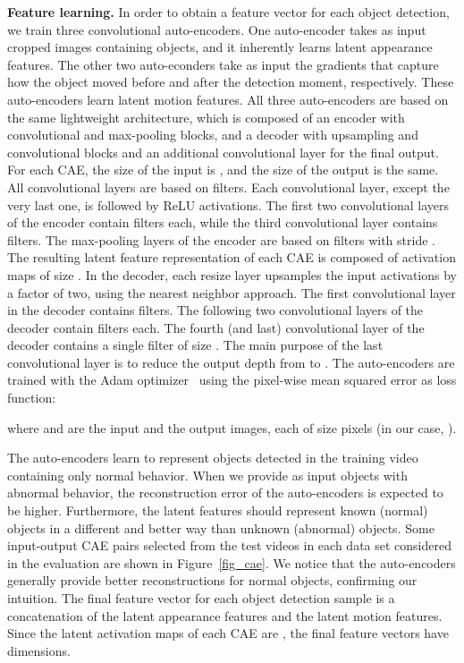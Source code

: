 \documentclass[10pt,twocolumn,letterpaper]{article}
\begin{document}
\noindent
{\bf Feature learning.}
In order to obtain a feature vector for each object detection, we train three convolutional auto-encoders. One auto-encoder takes as input cropped images containing objects, and it inherently learns latent appearance features. The other two auto-econders take as input the gradients that capture how the object moved before and after the detection moment, respectively. These auto-encoders learn latent motion features. All three auto-encoders are based on the same lightweight architecture, which is composed of an encoder with  convolutional and max-pooling blocks, and a decoder with  upsampling and convolutional blocks and an additional convolutional layer for the final output. For each CAE, the size of the input is , and the size of the output is the same. All convolutional layers are based on  filters. Each convolutional layer, except the very last one, is followed by ReLU activations. The first two convolutional layers of the encoder contain  filters each, while the third convolutional layer contains  filters. The max-pooling layers of the encoder are based on  filters with stride . The resulting latent feature representation of each CAE is composed of  activation maps of size . In the decoder, each resize layer upsamples the input activations by a factor of two, using the nearest neighbor approach. The first convolutional layer in the decoder contains  filters. The following two convolutional layers of the decoder contain  filters each. The fourth (and last) convolutional layer of the decoder contains a single filter of size . The main purpose of the last convolutional layer is to reduce the output depth from  to . The auto-encoders are trained with the Adam optimizer~\cite{Kingma-ICLR-2014} using the pixel-wise mean squared error as loss function:

where  and  are the input and the output images, each of size  pixels (in our case, ).

The auto-encoders learn to represent objects detected in the training video containing only normal behavior. When we provide as input objects with abnormal behavior, the reconstruction error of the auto-encoders is expected to be higher.  Furthermore, the latent features should represent known (normal) objects in a different and better way than unknown (abnormal) objects. Some input-output CAE pairs selected from the test videos in each data set considered in the evaluation are shown in Figure~\ref{fig_cae}. We notice that the auto-encoders generally provide better reconstructions for normal objects, confirming our intuition. The final feature vector for each object detection sample is a concatenation of the latent appearance features and the latent motion features. Since the latent activation maps of each CAE are , the final feature vectors have  dimensions.
\end{document}
